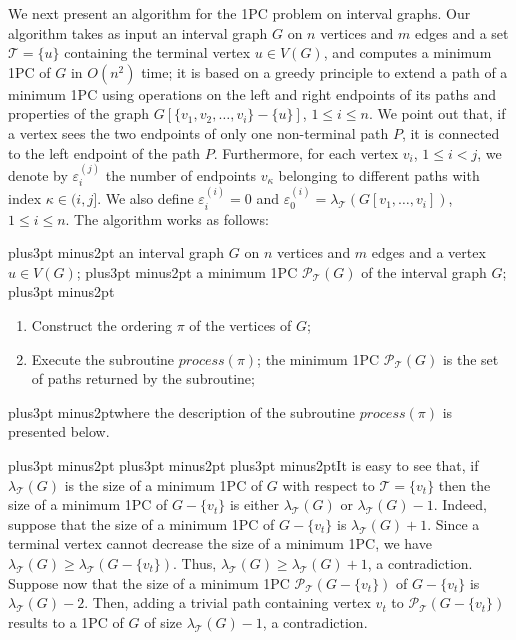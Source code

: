 \documentclass[10pt]{article}
\def\yskip{\penalty-50\vskip3pt plus3pt minus2pt}
\def\y{\yskip}
\def\yyy{\yskip\yskip\yskip}
\begin{document}
We next present an algorithm for the 1PC problem on interval
graphs. Our algorithm takes as input an interval graph $G$ on $n$
vertices and $m$ edges and a set $\mathcal{T}=\{u\}$ containing
the terminal vertex $u \in V(G)$, and computes a minimum 1PC of
$G$ in $O(n^2)$ time; it is based on a greedy principle to extend
a path of a minimum 1PC using operations on the left and right
endpoints of its paths and properties of the graph $G[\{v_1, v_2,
\ldots, v_i\}-\{u\}]$, $1 \leq i \leq n$. We point out that, if a
vertex sees the two endpoints of only one non-terminal path $P$,
it is connected to the left endpoint of the path $P$. Furthermore,
for each vertex $v_i$, $1 \leq i < j$, we denote by
$\varepsilon^{(j)}_i$ the number of endpoints $v_\kappa$ belonging
to different paths with index $\kappa \in (i,j]$. We also define
$\varepsilon^{(i)}_i=0$ and
$\varepsilon^{(i)}_0=\lambda_\mathcal{T}(G[v_1, \ldots, v_i])$, $1
\leq i \leq n$. The algorithm works as follows:


\bigskip {} \y {} an interval graph $G$ on $n$ vertices and $m$ edges and a
vertex $u \in V(G)$; \y {} a minimum 1PC
$\mathcal{P_{\mathcal{T}}}(G)$ of the interval graph $G$; \y

\begin{enumerate}
  \item Construct the ordering $\pi$ of the vertices of $G$;
  \item Execute the subroutine $process(\pi)$; the minimum
  1PC $\mathcal{P_{\mathcal{T}}}(G)$ is the set
  of paths returned by the subroutine;
\end{enumerate}

\y \noindent where the description of the subroutine
$process(\pi)$ is presented below.

\yyy It is easy to see that, if $\lambda_\mathcal{T}(G)$ is the
size of a minimum 1PC of $G$ with respect to $\mathcal{T}=\{v_t\}$
then the size of a minimum 1PC of $G-\{v_t\}$ is either
$\lambda_\mathcal{T}(G)$ or $\lambda_\mathcal{T}(G)-1$. Indeed,
suppose that the size of a minimum 1PC of $G-\{v_t\}$ is
$\lambda_\mathcal{T}(G)+1$. Since a terminal vertex cannot
decrease the size of a minimum 1PC, we have
$\lambda_\mathcal{T}(G) \geq \lambda_\mathcal{T}(G-\{v_t\})$.
Thus, $\lambda_\mathcal{T}(G) \geq \lambda_\mathcal{T}(G)+1$, a
contradiction. Suppose now that the size of a minimum 1PC
$\mathcal{P_{\mathcal{T}}}(G-\{v_t\})$ of $G-\{v_t\}$ is
$\lambda_\mathcal{T}(G)-2$. Then, adding a trivial path containing
vertex $v_t$ to $\mathcal{P_{\mathcal{T}}}(G-\{v_t\})$ results to
a 1PC of $G$ of size $\lambda_\mathcal{T}(G)-1$, a contradiction.
\end{document}
